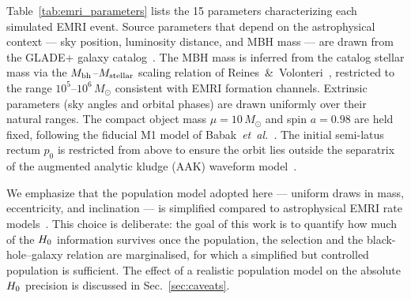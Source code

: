 
Table~\ref{tab:emri_parameters} lists the 15 parameters characterizing
each simulated EMRI event.  Source parameters that depend on the
astrophysical context --- sky position, luminosity distance, and MBH
mass --- are drawn from the GLADE+ galaxy catalog~\cite{Dalya:2021ewn}.
The MBH mass is inferred from the catalog stellar mass via the
$M_\mathrm{bh}$--$M_\mathrm{stellar}$ scaling relation of
Reines~\&~Volonteri~\cite{Reines:2015moa}, restricted to the range
$10^5$--$10^6\,M_\odot$ consistent with EMRI formation channels.
Extrinsic parameters (sky angles and orbital phases) are drawn uniformly
over their natural ranges.  The compact object mass $\mu = 10\,M_\odot$
and spin $a = 0.98$ are held fixed, following the fiducial M1 model of
Babak~\emph{et~al.}~\cite{Babak:2017tow}.  The initial semi-latus
rectum $p_0$ is restricted from above to ensure the orbit lies outside
the separatrix of the augmented analytic kludge (AAK)
waveform model~\cite{Chua:2020stf,Katz:2021yft}.

We emphasize that the population model adopted here --- uniform draws
in mass, eccentricity, and inclination --- is simplified compared
to astrophysical EMRI rate models~\cite{Babak:2017tow}.  This choice
is deliberate: the goal of this work is to quantify how much of the $H_0$
information survives once the population, the selection and the
black-hole--galaxy relation are marginalised, for which a simplified but controlled population is
sufficient.  The effect of a realistic population model on the absolute
$H_0$ precision is discussed in Sec.~\ref{sec:caveats}.

